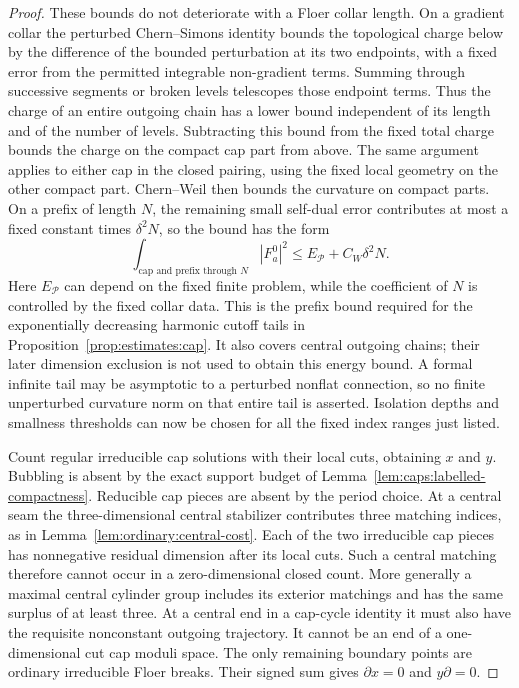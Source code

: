 \begin{proof}
These bounds do not deteriorate with a Floer collar length.  On a
gradient collar the perturbed Chern--Simons identity bounds the
topological charge below by the difference of the bounded perturbation
at its two endpoints, with a fixed error from the permitted integrable
non-gradient terms.  Summing through successive segments or broken
levels telescopes those endpoint terms.  Thus the charge of an entire
outgoing chain has a lower bound independent of its length and of the
number of levels.  Subtracting this bound from the fixed total charge
bounds the charge on the compact cap part from above.  The same argument
applies to either cap in the closed pairing, using the fixed local
geometry on the other compact part.  Chern--Weil then bounds the
curvature on compact parts.  On a prefix of length $N$, the remaining
small self-dual error contributes at most a fixed constant times
$\delta^2N$, so the bound has the form
\[
        \int_{\text{cap and prefix through }N}|F_a^0|^2
                     \le E_{\mathcal P}+C_W\delta^2N.
\]
Here $E_{\mathcal P}$ can depend on the fixed finite problem, while
the coefficient of $N$ is controlled by the fixed collar data.  This
is the prefix bound required for the exponentially decreasing harmonic
cutoff tails in Proposition~\ref{prop:estimates:cap}.  It also covers
central outgoing chains; their later dimension exclusion is not used
to obtain this energy bound.  A formal infinite tail may be asymptotic
to a perturbed nonflat connection, so no finite unperturbed curvature
norm on that entire tail is asserted.  Isolation depths and smallness
thresholds can now be chosen for all the fixed index ranges just listed.

Count regular irreducible cap solutions with their local cuts, obtaining
$x$ and $y$.  Bubbling is absent by the exact support budget of
Lemma~\ref{lem:caps:labelled-compactness}.  Reducible cap pieces are
absent by the period choice.  At a central seam the three-dimensional
central stabilizer contributes three matching indices, as in
Lemma~\ref{lem:ordinary:central-cost}.  Each of the two irreducible cap
pieces has nonnegative residual dimension after its local cuts.  Such
a central matching therefore cannot occur in a zero-dimensional closed
count.  More generally a maximal central cylinder group includes its
exterior matchings and has the same surplus of at least three.  At a
central end in a cap-cycle identity it must also have the requisite
nonconstant outgoing trajectory.  It cannot be an end of a
one-dimensional cut cap moduli space.  The only remaining boundary
points are ordinary irreducible Floer breaks.  Their signed sum gives
$\partial x=0$ and $y\partial=0$.


\end{proof}
